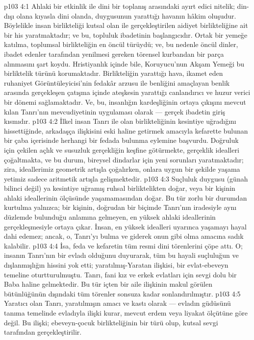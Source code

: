 \vs p103 4:1 Ahlaki bir etkinlik ile dini bir toplanış arasındaki ayırt edici nitelik; din\hyp{}dışı olana kıyasla dini olanda,  duygusunun yarattığı havanın hâkim oluşudur. Böylelikle insan birlikteliği kutsal olan ile gerçekleştirilen aidiyet birlikteliğine ait bir his yaratmaktadır; ve bu, topluluk ibadetinin başlangıcıdır. Ortak bir yemeğe katılma, toplumsal birlikteliğin en öncül türüydü; ve, bu nedenle öncül dinler, ibadet edenler tarafından yenilmesi gereken törensel kurbandan bir parça alınmasını şart koydu. Hristiyanlık içinde bile, Koruyucu’nun Akşam Yemeği bu birliktelik türünü korumaktadır. Birlikteliğin yarattığı hava, ikamet eden ruhaniyet Görüntüleyicisi’nin fedakâr arzusu ile benliğini amaçlayan benlik arasında gerçekleşen çatışma içinde ateşkesin yarattığı canlandırıcı ve huzur verici bir dönemi sağlamaktadır. Ve, bu, insanlığın kardeşliğinin ortaya çıkışını mevcut kılan Tanrı’nın mevcudiyetinin uygulaması olarak --- gerçek ibadetin giriş kısmıdır.
\vs p103 4:2 İlkel insan Tanrı ile olan birlikteliğinin kesintiye uğradığını hissettiğinde, arkadaşça ilişkisini eski haline getirmek amacıyla kefarette bulunan bir çaba içerisinde herhangi bir fedada bulunma eylemine başvurdu. Doğruluk için çekilen açlık ve susuzluk gerçekliğin keşfine götürmekte, gerçeklik idealleri çoğaltmakta, ve bu durum, bireysel dindarlar için yeni sorunları yaratmaktadır; zira, ideallerimiz geometrik artışla çoğalırken, onlara uygun bir şekilde yaşama yetimiz sadece aritmetik artışla gelişmektedir.
\vs p103 4:3 Suçluluk duygusu (günah bilinci değil) ya kesintiye uğramış ruhsal birliktelikten doğar, veya bir kişinin ahlaki ideallerinin ölçüsünde yaşamamasından doğar. Bu tür zorlu bir durumdan kurtulma yalnızca; bir kişinin, doğrudan bir biçimde Tanrı’nın iradesiyle aynı düzlemde bulunduğu anlamına gelmeyen, en yüksek ahlaki ideallerinin gerçekleşmesiyle ortaya çıkar. İnsan, en yüksek idealleri uyarınca yaşamayı hayal dahi edemez; ancak, o, Tanrı’yı bulma ve giderek onun gibi olma amacına sadık kalabilir.
\vs p103 4:4 İsa, feda ve kefaretin tüm resmi dini törenlerini çöpe attı. O; insanın Tanrı’nın bir evladı olduğunu duyurarak, tüm bu hayali suçluluğun ve dışlanmışlığın hissini yok etti; yaratılmış\hyp{}Yaratan ilişkisi, bir evlat\hyp{}ebeveyn temeline oturtturulmuştu. Tanrı, fani kız ve erkek evlatları için sevgi dolu bir Baba haline gelmektedir. Bu tür içten bir aile ilişkinin makul görülen bütünlüğünün dışındaki tüm törenler sonsuza kadar sonlandırılmıştır.
\vs p103 4:5 Yaratıcı olan Tanrı, yaratılmışın amacı ve kastı olarak --- evladın güdüsünü tanıma temelinde evladıyla ilişki kurar, mevcut erdem veya liyakat ölçütüne göre değil. Bu ilişki; ebeveyn\hyp{}çocuk birlikteliğinin bir türü olup, kutsal sevgi tarafından gerçekleştirilir.

